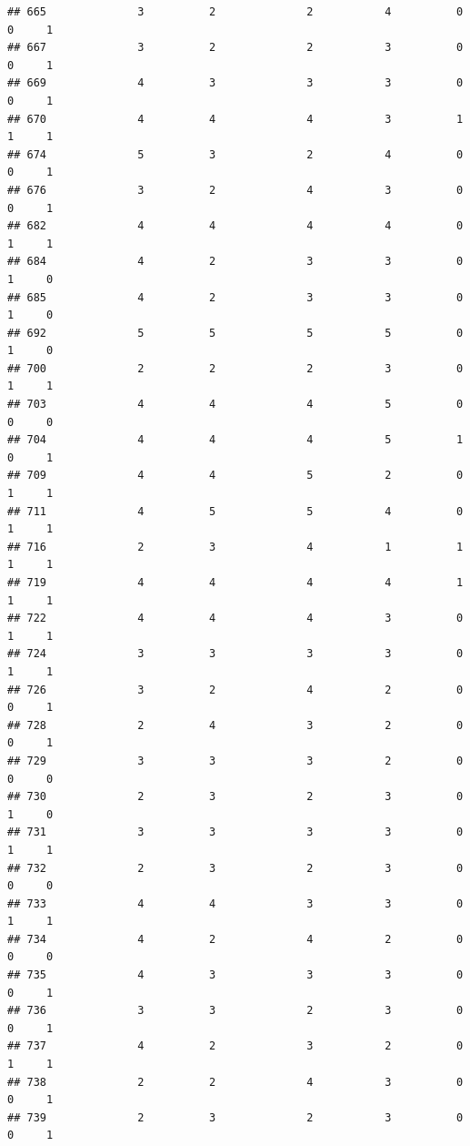 \documentclass[
]{article}
\begin{document}
\begin{verbatim}
## 665              3          2              2           4          0    0     1
## 667              3          2              2           3          0    0     1
## 669              4          3              3           3          0    0     1
## 670              4          4              4           3          1    1     1
## 674              5          3              2           4          0    0     1
## 676              3          2              4           3          0    0     1
## 682              4          4              4           4          0    1     1
## 684              4          2              3           3          0    1     0
## 685              4          2              3           3          0    1     0
## 692              5          5              5           5          0    1     0
## 700              2          2              2           3          0    1     1
## 703              4          4              4           5          0    0     0
## 704              4          4              4           5          1    0     1
## 709              4          4              5           2          0    1     1
## 711              4          5              5           4          0    1     1
## 716              2          3              4           1          1    1     1
## 719              4          4              4           4          1    1     1
## 722              4          4              4           3          0    1     1
## 724              3          3              3           3          0    1     1
## 726              3          2              4           2          0    0     1
## 728              2          4              3           2          0    0     1
## 729              3          3              3           2          0    0     0
## 730              2          3              2           3          0    1     0
## 731              3          3              3           3          0    1     1
## 732              2          3              2           3          0    0     0
## 733              4          4              3           3          0    1     1
## 734              4          2              4           2          0    0     0
## 735              4          3              3           3          0    0     1
## 736              3          3              2           3          0    0     1
## 737              4          2              3           2          0    1     1
## 738              2          2              4           3          0    0     1
## 739              2          3              2           3          0    0     1

\end{verbatim}
\end{document}
